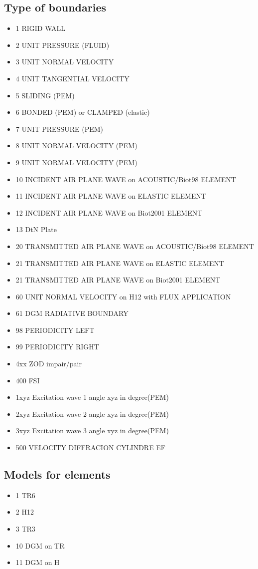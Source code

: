 \documentclass[11pt,A4paper]{book}
\renewcommand{\:}{\tb{:}}
\begin{document}
\subsection{Type of boundaries}
\begin{itemize}
\item 1 RIGID WALL
\item 2 UNIT PRESSURE (FLUID)
\item 3 UNIT NORMAL VELOCITY
\item 4 UNIT TANGENTIAL VELOCITY
\item 5 SLIDING (PEM)
\item 6 BONDED (PEM) or CLAMPED (elastic)
\item 7 UNIT PRESSURE (PEM)
\item 8 UNIT NORMAL VELOCITY (PEM)
\item 9 UNIT NORMAL VELOCITY (PEM)
\item 10 INCIDENT AIR PLANE WAVE on  ACOUSTIC/Biot98  ELEMENT 
\item 11 INCIDENT AIR PLANE WAVE on ELASTIC ELEMENT 
\item 12 INCIDENT AIR PLANE WAVE on Biot2001 ELEMENT
\item 13 DtN Plate
\item 20 TRANSMITTED AIR PLANE WAVE on  ACOUSTIC/Biot98  ELEMENT 
\item 21 TRANSMITTED AIR PLANE WAVE on ELASTIC ELEMENT 
\item 21 TRANSMITTED AIR PLANE WAVE on Biot2001 ELEMENT
\item 60 UNIT NORMAL VELOCITY on H12 with FLUX APPLICATION
\item 61 DGM RADIATIVE BOUNDARY
\item 98 PERIODICITY LEFT
\item 99 PERIODICITY RIGHT
\item 4xx ZOD impair/pair
\item 400 FSI
\item 1xyz Excitation wave 1 angle xyz in degree(PEM)
\item 2xyz Excitation wave 2 angle xyz in degree(PEM)
\item 3xyz Excitation wave 3 angle xyz in degree(PEM)
\item 500 VELOCITY DIFFRACION CYLINDRE EF
\end{itemize}


\subsection{Models for elements}
\begin{itemize}
\item 1 TR6
\item 2 H12
\item 3 TR3
\item 10 DGM on TR
\item 11 DGM on H
\end{itemize}
\end{document}
